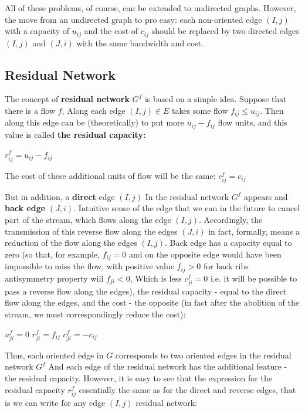 All of these problems, of course, can be extended to undirected graphs. However, the move from an undirected graph to pro easy: each non-oriented edge $(I, j)$ with a capacity of $u_ {ij}$ and the cost of $c_ {ij}$ should be replaced by two directed edges $(I, j)$ and $(J, i)$ with the same bandwidth and cost.

\subsection{ Residual Network }

The concept of \textbf{residual network} $G ^ f$ is based on a simple idea. Suppose that there is a flow $f$, Along each edge $(I, j) \in E$ takes some flow $f_ {ij} \le u_ {ij}$. Then along this edge can be (theoretically) to put more $u_ {ij} - f_ {ij}$ flow units, and this value is called \textbf{the residual capacity:}

$r_ {ij} ^ f = u_ {ij} - f_ {ij}$

The cost of these additional units of flow will be the same:
$c_ {ij} ^ f = c_ {ij}$

But in addition, a \textbf{direct} edge $(I, j)$ In the residual network $G ^ f$ appears and \textbf{back edge} $(J, i)$. Intuitive sense of the edge that we can in the future to cancel part of the stream, which flows along the edge $(I, j)$. Accordingly, the transmission of this reverse flow along the edges $(J, i)$ in fact, formally, means a reduction of the flow along the edges $(I, j)$. Back edge has a capacity equal to zero (so that, for example, $f_ {ij} = 0$ and on the opposite edge would have been impossible to miss the flow, with positive value $f_ {ij}> 0$ for back ribs antisymmetry property will $f_ {ji} <0$, Which is less $c_ {ji} ^ f = 0$ i.e. it will be possible to pass a reverse flow along the edges), the residual capacity - equal to the direct flow along the edges, and the cost - the opposite (in fact after the abolition of the stream, we must correspondingly reduce the cost):

$u_ {ji} ^ f = 0$
$r_ {ji} ^ f = f_ {ij}$
$c_ {ji} ^ f =-c_ {ij}$

Thus, each oriented edge in $G$ corresponds to two oriented edges in the residual network $G ^ f$ And each edge of the residual network has the additional feature - the residual capacity. However, it is easy to see that the expression for the residual capacity $r_ {ij} ^ f$ essentially the same as for the direct and reverse edges, that is we can write for any edge $(I, j)$ residual network:

